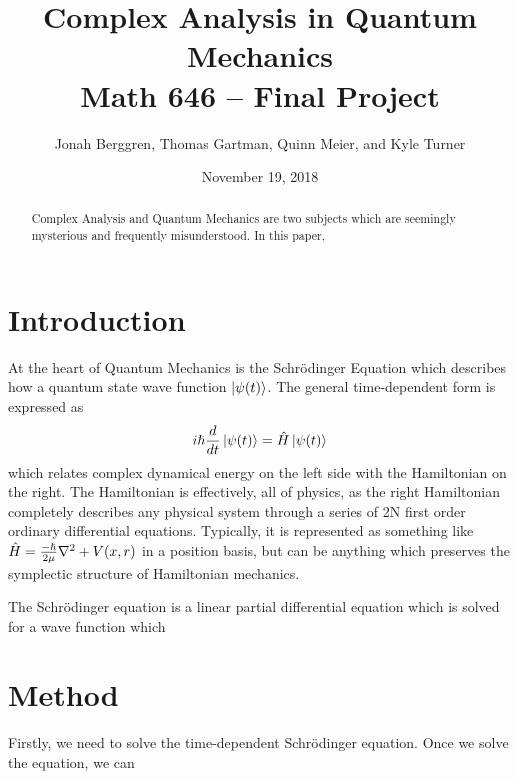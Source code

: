 \documentclass[12pt]{article}
\begin{document}
\title{Complex Analysis in Quantum Mechanics \\
Math 646 -- Final Project}
\author{Jonah Berggren, Thomas Gartman, Quinn Meier, and Kyle Turner}
\date{November 19, 2018}

\maketitle%

\begin{abstract}
Complex Analysis and Quantum Mechanics are two subjects which are seemingly mysterious and frequently misunderstood. In this paper, 
\end{abstract}


\section{Introduction}%
At the heart of Quantum Mechanics is the Schr\"{o}dinger Equation which describes how a quantum state wave function $\ket{\psi(t)}$. The general time-dependent form is expressed as
\begin{equation}
i\hslash \frac{d}{dt} \ket{\psi(t)} = \Hat{H} \ket{\psi(t)}
\end{equation}
which relates complex dynamical energy on the left side with the Hamiltonian on the right. The Hamiltonian is effectively, all of physics, as the right Hamiltonian completely describes any physical system through a series of 2N first order ordinary differential equations. Typically, it is represented as something like $\Hat{H} = \frac{-\hslash}{2\mu}\nabla ^2 + V(x,r)$ in a position basis, but can be anything which preserves the symplectic structure of Hamiltonian mechanics. 

The Schr\"{o}dinger equation is a linear partial differential equation which is solved for a wave function which 

\section{Method}

Firstly, we need to solve the time-dependent Schr\"{o}dinger equation. Once we solve the equation, we can  
\end{document}
